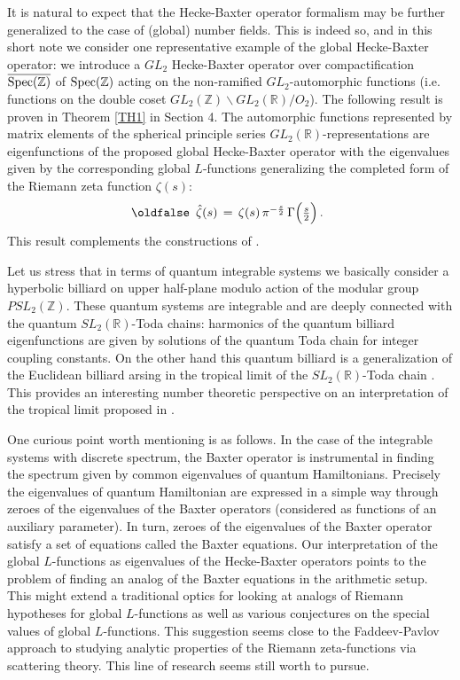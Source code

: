 \documentclass[12pt]{article}
\def\IR{\mathbb{R}}
\def\IZ{\mathbb{Z}}
\def\be{\begin{eqnarray}\new\begin{array}{cc}}
\def\ee{\end{array}\end{eqnarray}}
\newcounter{pac}[section]
\begin{document}
It is natural to expect that the Hecke-Baxter operator formalism may
be further generalized to the case of (global) number fields.
This is indeed so, and in this short note we consider one
representative example  of the global Hecke-Baxter operator: we introduce
a $GL_2$  Hecke-Baxter operator over compactification  $\overline{{\rm
    Spec}(\IZ)}$ of ${\rm  Spec}(\IZ)$ acting on the non-ramified $GL_2$-automorphic
functions (i.e. functions on the double coset $GL_2(\IZ)\backslash
GL_2(\IR)/O_2$). The following result is proven in   Theorem \ref{TH1} in Section 4.
The automorphic functions represented by  matrix elements
of the spherical principle series $GL_2(\IR)$-representations are
eigenfunctions of the proposed global Hecke-Baxter operator with the
eigenvalues given by the corresponding global
$L$-functions  generalizing the completed form of the Riemann zeta function $\zeta(s)$:
 \be
  \hat{\zeta}(s)\,=\,\zeta(s)\, \pi^{-\frac{s}{2}}\,\Gamma\Big(\frac{s}{2}\Big)\,.
 \ee
 This result complements the constructions of \cite{JL}.


 Let us stress that in terms of quantum integrable systems we basically consider
a hyperbolic billiard on upper half-plane modulo action of the
modular group $PSL_2(\IZ)$. These  quantum systems are integrable and are
deeply connected with the quantum
$SL_2(\IR)$-Toda chains: harmonics of the quantum billiard
eigenfunctions are given by solutions of the quantum Toda chain for
integer coupling constants. On the other hand this quantum billiard
is a generalization of the Euclidean billiard arsing in the tropical
limit of the $SL_2(\IR)$-Toda chain  \cite{GL}. This provides an interesting
number theoretic perspective on an interpretation of the tropical limit proposed in
\cite{GL}.



One curious  point worth mentioning is as follows.  In the case of
the integrable systems with discrete spectrum,  the Baxter operator is instrumental in
finding the spectrum given by common eigenvalues of quantum
Hamiltonians. Precisely the eigenvalues of quantum Hamiltonian are
expressed in a simple way through zeroes of the eigenvalues of the Baxter operators (considered as functions of an auxiliary parameter). In turn,
 zeroes of the eigenvalues of the Baxter operator satisfy a set of
 equations called the Baxter equations. Our interpretation of the global
 $L$-functions as eigenvalues of the Hecke-Baxter operators points to
 the problem of finding an  analog of the Baxter  equations in the
 arithmetic setup. This might extend a traditional optics
for looking at analogs of Riemann hypotheses for global $L$-functions as well as various conjectures on
 the special values of global $L$-functions. This suggestion seems
 close to  the Faddeev-Pavlov approach \cite{FP} to studying
 analytic properties of the Riemann zeta-functions  via scattering
 theory. This line of research seems still  worth to pursue.
\end{document}
